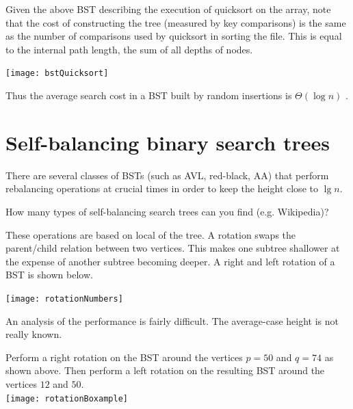 Given the above BST describing the execution of quicksort on the array, 
note that the cost of constructing the tree (measured by key comparisons) is 
the same as the number of comparisons used by quicksort in sorting the file.
This is equal to the internal path length, the sum of all depths of nodes.

\begin{center}
  \texttt{[image: bstQuicksort]}
\end{center}

Thus the average search cost in a BST built by random insertions is $\Theta(\log n)$ .


\chapter{Self-balancing binary search trees} %
\label{sec:balanced}
There are several classes of BSTs (such as AVL, red-black, AA) that 
perform rebalancing operations at crucial times in order to keep the height 
close to $\lg n$.

\begin{Boxample}[2]
How many types of self-balancing search trees can you find (e.g. Wikipedia)?
\end{Boxample}

These operations are based on local  of the tree. 
A rotation swaps the parent/child relation between two vertices.
This makes one subtree shallower at the expense of another subtree becoming deeper.
A right and left rotation of a BST is shown below.

\begin{center}
  \texttt{[image: rotationNumbers]}
\end{center}

An analysis of the performance is fairly difficult.
The average-case height is not really known.

\begin{Boxample}[7]
Perform a right rotation on the BST around the vertices $p = 50$ and $q = 74$ as shown above.
Then perform a left rotation on the resulting BST around the vertices $12$ and $50$.\\
\newline 
\texttt{[image: rotationBoxample]}
\end{Boxample}


